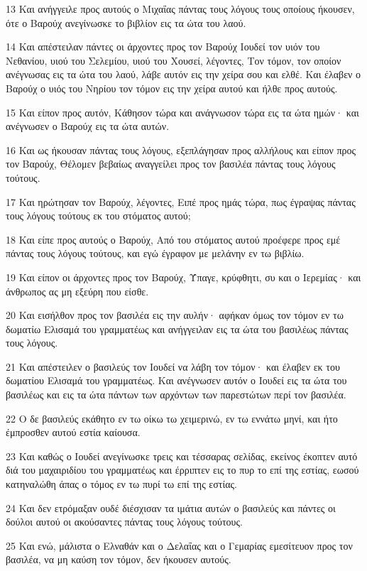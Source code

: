\par 13 Και ανήγγειλε προς αυτούς ο Μιχαΐας πάντας τους λόγους τους οποίους ήκουσεν, ότε ο Βαρούχ ανεγίνωσκε το βιβλίον εις τα ώτα του λαού.
\par 14 Και απέστειλαν πάντες οι άρχοντες προς τον Βαρούχ Ιουδεί τον υιόν του Νεθανίου, υιού του Σελεμίου, υιού του Χουσεί, λέγοντες, Τον τόμον, τον οποίον ανέγνωσας εις τα ώτα του λαού, λάβε αυτόν εις την χείρα σου και ελθέ. Και έλαβεν ο Βαρούχ ο υιός του Νηρίου τον τόμον εις την χείρα αυτού και ήλθε προς αυτούς.
\par 15 Και είπον προς αυτόν, Κάθησον τώρα και ανάγνωσον τώρα εις τα ώτα ημών· και ανέγνωσεν ο Βαρούχ εις τα ώτα αυτών.
\par 16 Και ως ήκουσαν πάντας τους λόγους, εξεπλάγησαν προς αλλήλους και είπον προς τον Βαρούχ, Θέλομεν βεβαίως αναγγείλει προς τον βασιλέα πάντας τους λόγους τούτους.
\par 17 Και ηρώτησαν τον Βαρούχ, λέγοντες, Ειπέ προς ημάς τώρα, πως έγραψας πάντας τους λόγους τούτους εκ του στόματος αυτού;
\par 18 Και είπε προς αυτούς ο Βαρούχ, Από του στόματος αυτού προέφερε προς εμέ πάντας τους λόγους τούτους, και εγώ έγραφον με μελάνην εν τω βιβλίω.
\par 19 Και είπον οι άρχοντες προς τον Βαρούχ, Ύπαγε, κρύφθητι, συ και ο Ιερεμίας· και άνθρωπος ας μη εξεύρη που είσθε.
\par 20 Και εισήλθον προς τον βασιλέα εις την αυλήν· αφήκαν όμως τον τόμον εν τω δωματίω Ελισαμά του γραμματέως και ανήγγειλαν εις τα ώτα του βασιλέως πάντας τους λόγους.
\par 21 Και απέστειλεν ο βασιλεύς τον Ιουδεί να λάβη τον τόμον· και έλαβεν εκ του δωματίου Ελισαμά του γραμματέως. Και ανέγνωσεν αυτόν ο Ιουδεί εις τα ώτα του βασιλέως και εις τα ώτα πάντων των αρχόντων των παρεστώτων περί τον βασιλέα.
\par 22 Ο δε βασιλεύς εκάθητο εν τω οίκω τω χειμερινώ, εν τω εννάτω μηνί, και ήτο έμπροσθεν αυτού εστία καίουσα.
\par 23 Και καθώς ο Ιουδεί ανεγίνωσκε τρεις και τέσσαρας σελίδας, εκείνος έκοπτεν αυτό διά του μαχαιριδίου του γραμματέως και έρριπτεν εις το πυρ το επί της εστίας, εωσού κατηναλώθη άπας ο τόμος εν τω πυρί τω επί της εστίας.
\par 24 Και δεν ετρόμαξαν ουδέ διέσχισαν τα ιμάτια αυτών ο βασιλεύς και πάντες οι δούλοι αυτού οι ακούσαντες πάντας τους λόγους τούτους.
\par 25 Και ενώ, μάλιστα ο Ελναθάν και ο Δελαΐας και ο Γεμαρίας εμεσίτευον προς τον βασιλέα, να μη καύση τον τόμον, δεν ήκουσεν αυτούς.
